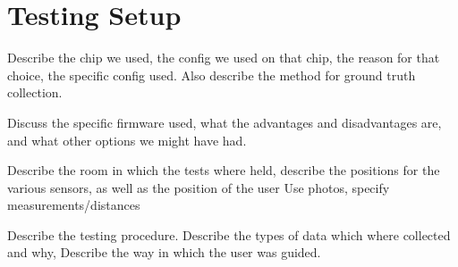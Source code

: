 
\section{Testing Setup}
\label{section: setup baseline dataset - testing setup}

Describe the chip we used, the config we used on that chip, the reason for that choice, the specific config used.
Also describe the method for ground truth collection.

Discuss the specific firmware used, what the advantages and disadvantages are, and what other options we might have had.

Describe the room in which the tests where held, describe the positions for the various sensors, as well as the position of the user
Use photos, specify measurements/distances

Describe the testing procedure.
Describe the types of data which where collected and why,
Describe the way in which the user was guided.



